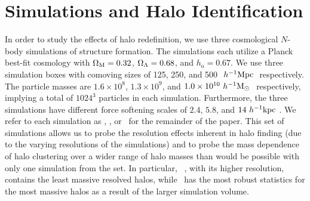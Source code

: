 \documentclass[usenatbib,usegraphicx,letterpaper]{mn2e}
\begin{document}
\section[]{Simulations and Halo Identification}
\label{section:data}

In order to study the effects of halo redefinition, we use three cosmological $N$-body simulations of structure formation. The \citet{diemer15} simulations each utilize a Planck best-fit cosmology with $\Omega_{\mathrm{M}} = 0.32$, $\Omega_{\Lambda} = 0.68$, and $h_{\mathrm{o}} = 0.67$. We use three simulation boxes with comoving sizes of 125, 250, and 500 $\ h^{-1}\mathrm{Mpc}~$ respectively. The particle masses are $1.6 \times 10^8$, $1.3 \times 10^9$, and $1.0 \times 10^{10} \ h^{-1}\mathrm{M}_{\odot}~$ respectively, implying a total of $1024^3$ particles in each simulation. Furthermore, the three simulations have different force softening scales of $2.4$, $5.8$, and $14 \ h^{-1}\mathrm{kpc}~$. We refer to each simulation as \simA, \simB, or \simC  \ for the remainder of the paper. This set of simulations allows us to probe the resolution effects inherent in halo finding (due to the varying resolutions of the simulations) and to probe the mass dependence of halo clustering over a wider range of halo masses than would be possible with only one simulation from the set. In particular, \simA~, with its higher resolution, contains the least massive resolved halos, while \simC~has the most robust statistics for the most massive halos as a result of the larger simulation volume.

\end{document}
